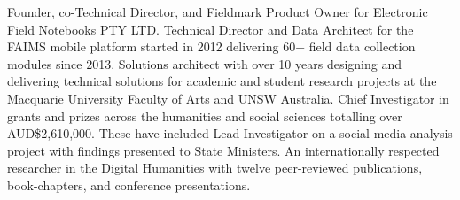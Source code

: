 
Founder, co-Technical Director, and Fieldmark Product Owner for Electronic Field Notebooks PTY LTD. Technical Director and Data Architect for the FAIMS mobile platform started in 2012  delivering 60+ field data collection modules since 2013. 
Solutions architect with over 10 years designing and delivering technical solutions for academic and student research projects at the Macquarie University Faculty of Arts and UNSW Australia. Chief Investigator in grants and prizes across the humanities and social sciences totalling over AUD\$2,610,000. These have included Lead Investigator on a social media analysis project with findings presented to State Ministers. An internationally respected researcher in the Digital Humanities with twelve peer-reviewed publications, book-chapters, and conference presentations.


